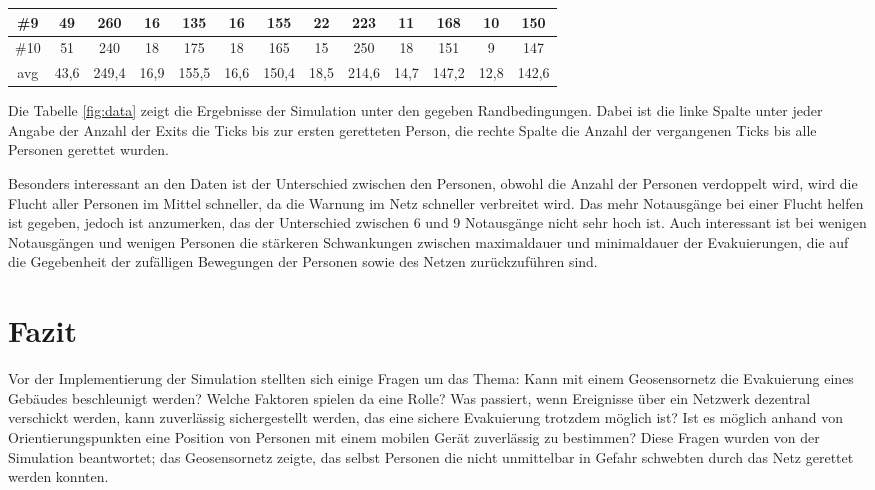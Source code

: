 \begin{table}[h]
\begin{tabular}{c|c|c|c|c|c|c|c|c|c|c|c|c|}
\multicolumn{1}{|c|}{\#9}  & 49           & 260           & 16           & 135           & 16           & 155           & 22           & 223           & 11           & 168           & 10            & 150           \\ \hline
\multicolumn{1}{|c|}{\#10} & 51           & 240           & 18           & 175           & 18           & 165           & 15           & 250           & 18           & 151           & 9             & 147           \\ \hline
\multicolumn{1}{|c|}{avg}  & 43,6         & 249,4         & 16,9         & 155,5         & 16,6         & 150,4         & 18,5         & 214,6         & 14,7         & 147,2         & 12,8          & 142,6         \\ \hline
\end{tabular}
\end{table}

Die Tabelle \ref{fig:data} zeigt die Ergebnisse der Simulation unter den gegeben Randbedingungen. Dabei ist die linke Spalte unter jeder Angabe der Anzahl der Exits die Ticks bis zur ersten geretteten Person, die rechte Spalte die Anzahl der vergangenen Ticks bis alle Personen gerettet wurden.

Besonders interessant an den Daten ist der Unterschied zwischen den Personen, obwohl die Anzahl der Personen verdoppelt wird, wird die Flucht aller Personen im Mittel schneller, da die Warnung im Netz schneller verbreitet wird. Das mehr Notausgänge bei einer Flucht helfen ist gegeben, jedoch ist anzumerken, das der Unterschied zwischen 6 und 9 Notausgänge nicht sehr hoch ist. Auch interessant ist bei wenigen Notausgängen und wenigen Personen die stärkeren Schwankungen zwischen maximaldauer und minimaldauer der Evakuierungen, die auf die Gegebenheit der zufälligen Bewegungen der Personen sowie des Netzen zurückzuführen sind.

\section{Fazit}

Vor der Implementierung der Simulation stellten sich einige Fragen um das Thema: Kann mit einem Geosensornetz die Evakuierung eines Gebäudes beschleunigt werden? Welche Faktoren spielen da eine Rolle? Was passiert, wenn Ereignisse über ein Netzwerk dezentral verschickt werden, kann zuverlässig sichergestellt werden, das eine sichere Evakuierung trotzdem möglich ist? Ist es möglich anhand von Orientierungspunkten eine Position von Personen mit einem mobilen Gerät zuverlässig zu bestimmen? Diese Fragen wurden von der Simulation beantwortet; das Geosensornetz zeigte, das selbst Personen die nicht unmittelbar in Gefahr schwebten durch das Netz gerettet werden konnten.

